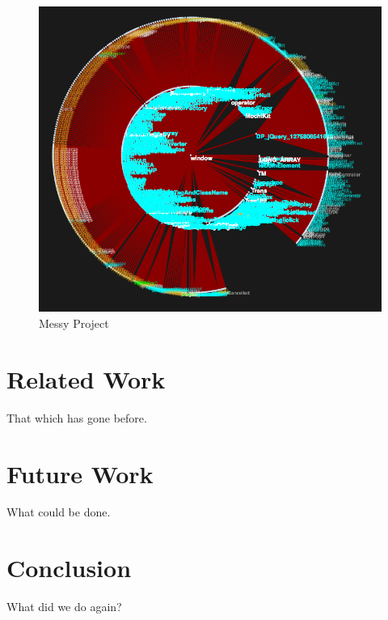 \documentclass{article}
\begin{document}
\begin{figure}[messy]
  \begin{center}
    \includegraphics[scale=.5]{messy.png}
  \end{center}
  \caption{Messy Project}
  \label{fig:messy}
\end{figure}

\section{Related Work}
\label{sec:related}
That which has gone before.

\section{Future Work}
\label{sec:future}
What could be done.

\section{Conclusion}
\label{sec:conclusion}
What did we do again?



\end{document}
